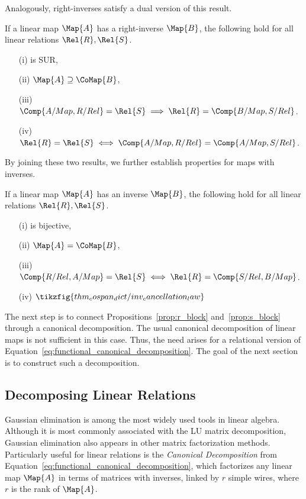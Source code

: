\documentclass[manyauthors]{fundam}
\begin{document}
Analogously, right-inverses satisfy a dual version of this result.
\begin{proposition}
\label{thm:prop_rinverse}
If a linear map $\Map{A}$ has a right-inverse $\Map{B}$, the following hold for all linear relations $\Rel{R}, \Rel{S}$.
\begin{enumerate}
    \item[(i)]  is SUR,
    \item[(ii)] $\Map{A} \supseteq \CoMap{B}$,
    \item[(iii)] $\Comp{A/Map, R/Rel} = \Rel{S} \implies \Rel{R} = \Comp{B/Map, S/Rel}$.
    \item[(iv)] $\Rel{R} = \Rel{S} \iff \Comp{A/Map, R/Rel} = \Comp{A/Map, S/Rel}$.
\end{enumerate}
\end{proposition}

By joining these two results, we further establish properties for maps with inverses.
\begin{proposition}
\label{thm:prop_inverse}
If a linear map $\Map{A}$ has an inverse $\Map{B}$, the following hold for all linear relations $\Rel{R}, \Rel{S}$.
\begin{enumerate}
    \item[(i)]  is bijective,
    \item[(ii)] $\Map{A} = \CoMap{B}$,
    \item[(iii)] $\Comp{R/Rel, A/Map} = \Rel{S} \iff \Rel{R} = \Comp{S/Rel, B/Map}$.
    \item[(iv)] $\tikzfig{thm_cospan_dict/inv_cancellation_law}$
\end{enumerate}
\end{proposition}

The next step is to connect Propositions~\ref{prop:r_block} and~\ref{prop:s_block}
through a canonical decomposition.
The usual canonical decomposition of linear maps is not sufficient in this case.
Thus, the need arises for a relational version of Equation~\eqref{eq:functional_canonical_decomposition}.
The goal of the next section is to construct such a decomposition.


\subsection{Decomposing Linear Relations}
\label{sec:decomposition_relations}

Gaussian elimination is among the most widely used tools in linear algebra.
Although it is most commonly associated with the LU matrix decomposition, Gaussian elimination also appears in other matrix factorization methods.
Particularly useful for linear relations is the \emph{Canonical Decomposition} from Equation~\eqref{eq:functional_canonical_decomposition},
which factorizes any linear map $\Map{A}$ in terms of matrices with inverses, linked by $r$ simple wires, where $r$ is the rank of $\Map{A}$.
\end{document}
